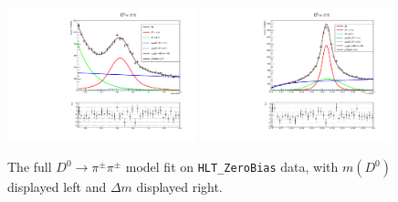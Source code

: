\begin{figure}[htp]
    \begin{center}
      \includegraphics[width=0.49\textwidth]{figures/chapter4/normalization_fit/m_pipiDimuon_afterMvaCut.pdf}
      \includegraphics[width=0.49\textwidth]{figures/chapter4/normalization_fit/dm_pipiDimuon_afterMvaCut.pdf}\\
    \end{center}
    \caption{
        The full $D^0 \to \pi^\pm \pi^\pm$ model fit on \texttt{HLT\_ZeroBias} data, with $m(D^0)$ displayed left and $\Delta m$ displayed right.
    }
    \label{fig:d0pipi_uml_fit}
\end{figure}

